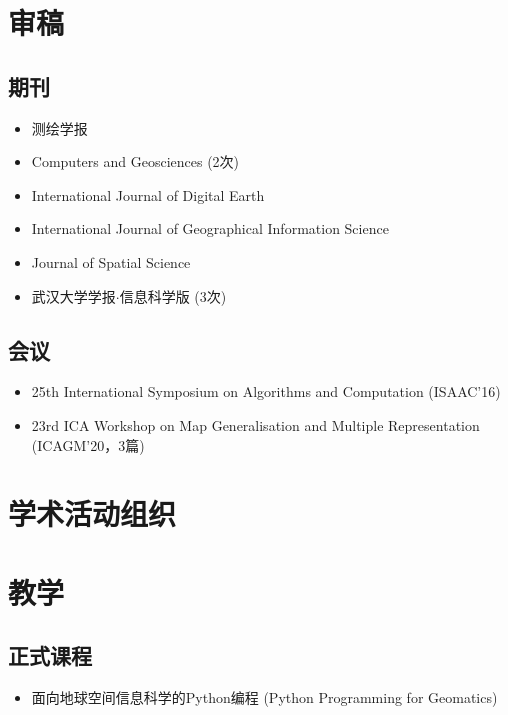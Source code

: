 \documentclass{resume}
\begin{document}
\section{审稿}
\subsection{期刊}
\begin{itemize}[parsep=0ex]
\item 测绘学报
\item Computers and Geosciences (2次)
\item International Journal of Digital Earth
\item International Journal of Geographical Information Science
\item Journal of Spatial Science
\item 武汉大学学报$\cdot$信息科学版 (3次)
\end{itemize}

\subsection{会议}
\begin{itemize}[parsep=0ex]
\item 25th International Symposium on Algorithms and Computation (ISAAC'16)
\item 23rd ICA Workshop on
    Map Generalisation and Multiple Representation (ICAGM'20，3篇)
\end{itemize}

\section{学术活动组织}
\begin{itemize}[parsep=0ex]
\end{itemize}

\section{教学}
\subsection{正式课程}
\begin{itemize}[parsep=0ex]
\item 面向地球空间信息科学的Python编程 (Python Programming for Geomatics)
\end{itemize}
\end{document}

